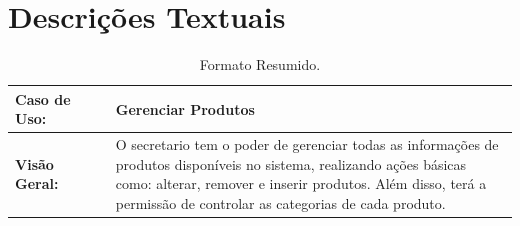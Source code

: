 \documentclass[a4paper, 12pt]{article}
\begin{document}
	\section{Descrições Textuais}
	
	\begin{table}[H]
		
		\centering
		\begin{tabular}{p{0.2\linewidth}  p{0.8\linewidth}}
			\toprule
			
			\textbf{Caso de Uso:} & Gerenciar Produtos\\ \midrule
			\textbf{Visão Geral:} & O secretario tem o poder de gerenciar todas as informações de produtos disponíveis no sistema, realizando ações básicas como: alterar, remover e inserir produtos. Além disso, terá a permissão de controlar as categorias de cada produto. \\ 
	
			\bottomrule
		\end{tabular}
	\caption{ {\small Formato Resumido.}}
	\end{table}

	\vspace{2cm}
\end{document}
